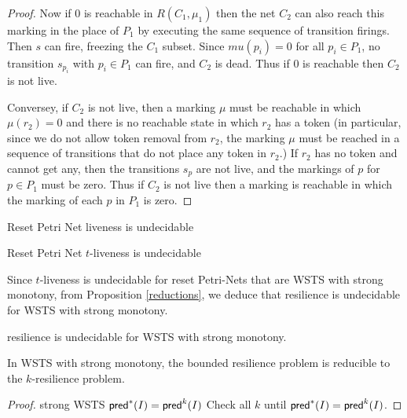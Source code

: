\begin{proof}
Now if $0$ is reachable
in $R(C_1, \mu_1)$ 
then the net $C_2$ can also reach this marking
in the place of $P_1$ by executing the same sequence of transition firings.
Then $s$ can fire, freezing the $C_1$ subset.
Since $mu(p_i) = 0$ for all $p_i \in P_1$, no transition $s_{p_i}$ with $p_i \in P_1$ can fire, and $C_2$ is dead.
Thus if $0$ is reachable then $C_2$ is not live.

Conversey, if $C_2$ is not live, then a marking $\mu$ must be reachable in which 
$\mu(r_2) = 0$ and there is no reachable state in which $r_2$ has a token
(in particular, since we do not allow token removal from $r_2$, the marking $\mu$ must be reached in a sequence of transitions that do not place any token in $r_2$.)
If $r_2$ has no token and cannot get any, then the transitions $s_p$ are not live, and the markings of $p$ for $p \in P_1$ must be zero. 
Thus if $C_2$ is not live then a marking is reachable in which the marking of each $p$ in $P_1$ is zero. 


\end{proof}

\begin{corollary}
Reset Petri Net liveness is undecidable 
\end{corollary}

\begin{corollary}
Reset Petri Net $t$-liveness is undecidable 
\end{corollary}


Since $t$-liveness is undecidable for reset Petri-Nets that are WSTS with strong monotony, from Proposition \ref{reductions},  we deduce that resilience is undecidable for WSTS with strong monotony.

\begin{theorem}
{\sc resilience} is undecidable for WSTS with strong monotony.
\end{theorem}






\begin{proposition}
In WSTS with strong monotony, the bounded resilience problem is
reducible to the $k$-resilience problem.
\end{proposition}

\begin{proof}
strong WSTS
$\textsf{pred}^*(I) = \textsf{pred}^{k}(I)$
Check all $k$ until $\textsf{pred}^*(I) = \textsf{pred}^{k}(I)$.
\end{proof}

